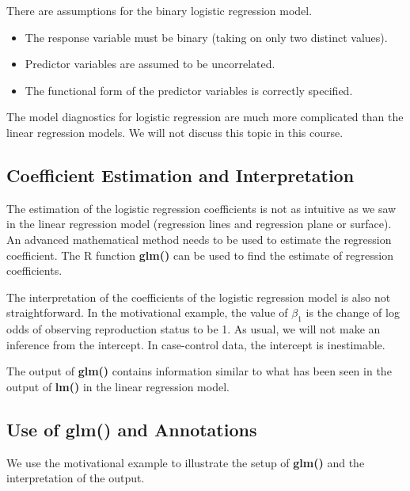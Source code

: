 \documentclass[
]{book}
\begin{document}
There are assumptions for the binary logistic regression model.

\begin{itemize}
\item
  The response variable must be binary (taking on only two distinct values).
\item
  Predictor variables are assumed to be uncorrelated.
\item
  The functional form of the predictor variables is correctly specified.
\end{itemize}

The model diagnostics for logistic regression are much more complicated than the linear regression models. We will not discuss this topic in this course.

\hypertarget{coefficient-estimation-and-interpretation}{%
\subsection{Coefficient Estimation and Interpretation}\label{coefficient-estimation-and-interpretation}}

The estimation of the logistic regression coefficients is not as intuitive as we saw in the linear regression model (regression lines and regression plane or surface). An advanced mathematical method needs to be used to estimate the regression coefficient. The R function \textbf{glm()} can be used to find the estimate of regression coefficients.

The interpretation of the coefficients of the logistic regression model is also not straightforward. In the motivational example, the value of \(\beta_1\) is the change of log odds of observing reproduction status to be 1. As usual, we will not make an inference from the intercept. In case-control data, the intercept is inestimable.

The output of \textbf{glm()} contains information similar to what has been seen in the output of \textbf{lm()} in the linear regression model.

\hypertarget{use-of-glm-and-annotations}{%
\subsection{\texorpdfstring{Use of \textbf{glm()} and Annotations}{Use of glm() and Annotations}}\label{use-of-glm-and-annotations}}

We use the motivational example to illustrate the setup of \textbf{glm()} and the interpretation of the output.
\end{document}
